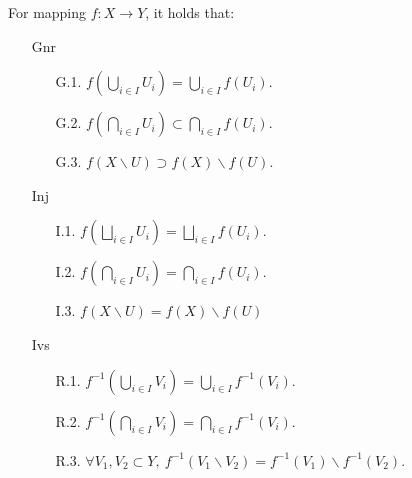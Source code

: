 \begin{proposition}
  For mapping $f: X \to Y$, it holds that:
  \begin{enumerate}
    \item[Gnr]
    \begin{enumerate}
      \item[G.1.] $f(\bigcup_{i \in I} U_i) = \bigcup_{i \in I} f(U_i)$.
      \item[G.2.] $f(\bigcap_{i \in I} U_i) \subset \bigcap_{i \in I} f(U_i)$.
      \item[G.3.] $f(X \smallsetminus U) \supset f(X) \smallsetminus f(U)$.
    \end{enumerate}
    \item[Inj]
    \begin{enumerate}
      \item[I.1.] $f(\bigsqcup_{i\in I} U_i) = \bigsqcup_{i \in I} f(U_i)$.
      \item[I.2.] $f(\bigcap_{i \in I} U_i) = \bigcap_{i \in I} f(U_i)$.
      \item[I.3.] $f(X \smallsetminus U) = f(X) \smallsetminus f(U)$
    \end{enumerate}
    \item[Ivs]
    \begin{enumerate}
      \item[R.1.] $f^{-1}(\bigcup_{i \in I} V_i) = \bigcup_{i \in I} f^{-1}(V_i)$.
      \item[R.2.]  $f^{-1}(\bigcap_{i \in I} V_i) = \bigcap_{i \in I} f^{-1}(V_i)$.
      \item[R.3.]  $\forall V_1, V_2 \subset Y, \ f^{-1}(V_1 \smallsetminus V_2) = f^{-1}(V_1) \smallsetminus f^{-1}(V_2)$.
    \end{enumerate}
  \end{enumerate}
\end{proposition}

